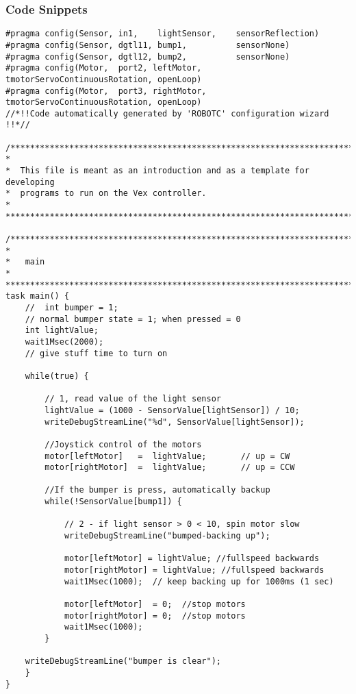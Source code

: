 \documentclass[12pt]{report}
\begin{document}
\subsubsection{Code Snippets}
\lstset{language=C}
\begin{lstlisting}
#pragma config(Sensor, in1,    lightSensor,    sensorReflection)
#pragma config(Sensor, dgtl11, bump1,          sensorNone)
#pragma config(Sensor, dgtl12, bump2,          sensorNone)
#pragma config(Motor,  port2, leftMotor,  tmotorServoContinuousRotation, openLoop)
#pragma config(Motor,  port3, rightMotor, tmotorServoContinuousRotation, openLoop)
//*!!Code automatically generated by 'ROBOTC' configuration wizard               !!*//
	
/*******************************************************************************
*
*  This file is meant as an introduction and as a template for developing
*  programs to run on the Vex controller.
*
*******************************************************************************/
	
/*******************************************************************************
*
*	main
*
*******************************************************************************/
task main() {
	//  int bumper = 1;	              
	// normal bumper state = 1; when pressed = 0
	int lightValue;
	wait1Msec(2000);    					
	// give stuff time to turn on
	
	while(true) {
	
		// 1, read value of the light sensor
		lightValue = (1000 - SensorValue[lightSensor]) / 10;
		writeDebugStreamLine("%d", SensorValue[lightSensor]);
	
		//Joystick control of the motors
		motor[leftMotor]   =  lightValue;       // up = CW
		motor[rightMotor]  =  lightValue;       // up = CCW
	
		//If the bumper is press, automatically backup
		while(!SensorValue[bump1]) {
	
			// 2 - if light sensor > 0 < 10, spin motor slow
			writeDebugStreamLine("bumped-backing up");
	
			motor[leftMotor] = lightValue; //fullspeed backwards
			motor[rightMotor] = lightValue; //fullspeed backwards
			wait1Msec(1000);  // keep backing up for 1000ms (1 sec)
	
			motor[leftMotor]  = 0;  //stop motors
			motor[rightMotor] = 0;  //stop motors
			wait1Msec(1000);
		}
	
	writeDebugStreamLine("bumper is clear");
	}
}
	
\end{lstlisting}
\end{document}
